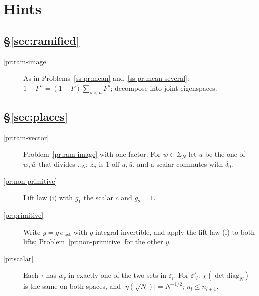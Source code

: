 \documentclass[reqno]{amsart}
\theoremstyle{plain}
\theoremstyle{definition}
\theoremstyle{remark}
\newcommand{\dg}{\mathrm{diag}_N}
\newcommand{\elast}{e_{\mathrm{last}}}
\begin{document}
\section*{Hints}

\subsection*{\S\ref{sec:ramified}}
\begin{description}
\item[\ref{pr:ram-image}] As in Problems~\ref{ss-pr:mean} and~\ref{ss-pr:mean-several}: \(1 - F^n = (1 - F)\sum_{s<n}F^s\); decompose into joint eigenspaces.
\end{description}

\subsection*{\S\ref{sec:places}}
\begin{description}
\item[\ref{pr:ram-vector}] Problem~\ref{pr:ram-image} with one factor.  For \(w \in \Sigma_N\) let \(u\) be the one of \(w, \bar w\) that divides \(\pi_N\); \(z_u\) is \(1\) off \(u, \bar u\), and a scalar commutes with \(\delta_0\).
\item[\ref{pr:non-primitive}] Lift law (i) with \(g_1\) the scalar \(c\) and \(g_2 = 1\).
\item[\ref{pr:primitive}] Write \(y = \bar g\,\elast\) with \(g\) integral invertible, and apply the lift law (i) to both lifts; Problem~\ref{pr:non-primitive} for the other \(y\).
\item[\ref{pr:scalar}] Each \(\tau\) has \(\bar w_\tau\) in exactly one of the two sets in \(\varepsilon_i\).  For \(\varepsilon'_l\): \(\chi(\det\dg)\) is the same on both spaces, and \(\lvert\eta(\sqrt N)\rvert = N^{-1/2}\); \(n_l \le n_{l+1}\).
\end{description}
\end{document}
